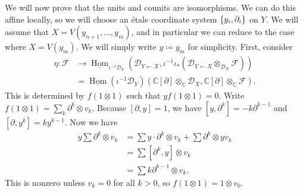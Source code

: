 \documentclass[leqno, openany]{memoir}
\theoremstyle{definition}
\theoremstyle{remark}
\theoremstyle{plain}
\theoremstyle{definition}
\theoremstyle{remark}
\newcommand{\C}{\mathbb{C}}
\newcommand{\mc}[1]{\mathcal{#1}}
\newcommand{\ul}[1]{\underline{#1}}
\DeclareMathOperator{\Hom}{Hom}
\begin{document}
    We will now prove that the units and counits are isomorphisms. We can do this affine locally, so we will choose an \'etale coordinate system $\qty{y_i, \partial_i}$ on $Y$. We will assume that $X = V(y_{n+1}, \ldots, y_m)$, and in particular we can reduce to the case where $X = V(y_m)$. We will simply write $y \coloneqq y_m$ for simplicity. First, consider
    \begin{align*}
        \eta \colon \mc{F} &\to \ul{\Hom}_{\iota^{-1} \mc{D}_Y} (\mc{D}_{Y \gets X}, \iota^{-1} \iota_* (\mc{D}_{Y \gets X} \otimes_{\mc{D}_X} \mc{F})) \\
        &= \ul{\Hom}(\iota^{-1} \mc{D}_Y) (\C[\partial] \otimes_{\C} \mc{D}_X, \C[\partial] \otimes_{\C} \mc{F}).
    \end{align*}
    This is determined by $f(1 \otimes 1)$ such that $y f(1 \otimes 1) = 0$. Write $f(1 \otimes 1) = \sum_k \partial^k \otimes v_k$. Because $[\partial, y] = 1$, we have $[y, \partial^k] = -k\partial^{k-1}$ and $[\partial, y^k] = ky^{k-1}$. Now we have
    \begin{align*}
        y \sum \partial^k \otimes v_k &= \sum y \cdot \partial^k \otimes v_k + \sum \partial^k \otimes y v_k \\
        &= \sum [\partial^k, y] \otimes v_k \\
        &= \sum k \partial^{k-1} \otimes v_k.
    \end{align*}
    This is nonzero unless $v_k = 0$ for all $k > 0$, so $f(1 \otimes 1) = 1 \otimes v_0$.
\end{document}
